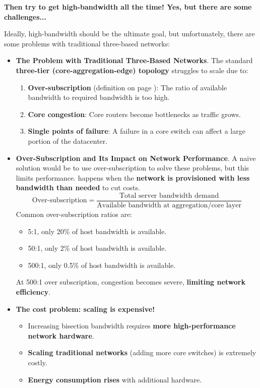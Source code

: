 \highspace
\begin{flushleft}
    \textcolor{Red2}{ \textbf{Then try to get high-bandwidth all the time! Yes, but there are some challenges...}}
\end{flushleft}
Ideally, high-bandwidth should be the ultimate goal, but unfortunately, there are some problems with traditional three-based networks:
\begin{itemize}[label=\textcolor{Red2}{}]
    \item \textcolor{Red2}{\textbf{The Problem with Traditional Three-Based Networks}}. The standard \textbf{three-tier (core-aggregation-edge) topology} struggles to scale due to:
    \begin{enumerate}
        \item \textbf{Over-subscription} (definition on page ): The ratio of available bandwidth to required bandwidth is too high.
        \item \textbf{Core congestion}: Core routers become bottlenecks as traffic grows.
        \item \textbf{Single points of failure}: A failure in a core switch can affect a large portion of the datacenter.
    \end{enumerate}

    \item \textcolor{Red2}{\textbf{Over-Subscription and Its Impact on Network Performance}}. A naive solution would be to use over-subscription to solve these problems, but this limits performance.  happens when the \textbf{network is provisioned with less bandwidth than needed} to cut costs.
    \begin{equation*}
        \text{Over-subscription} = \dfrac{\text{Total server bandwidth demand}}{\text{Available bandwidth at aggregation/core layer}}
    \end{equation*}
    Common over-subscription ratios are:
    \begin{itemize}
        \item 5:1, only 20\% of host bandwidth is available.
        \item 50:1, only 2\% of host bandwidth is available.
        \item 500:1, only 0.5\% of host bandwidth is available.
    \end{itemize}
    At 500:1 over subscription, congestion becomes severe, \textbf{limiting network efficiency}.
    
    \item \textcolor{Red2}{\textbf{The cost problem: scaling is expensive!}}
    \begin{itemize}
        \item Increasing bisection bandwidth requires \textbf{more high-performance network hardware}.
        \item \textbf{Scaling traditional networks} (adding more core switches) is extremely costly.
        \item \textbf{Energy consumption rises} with additional hardware.
    \end{itemize}
\end{itemize}
